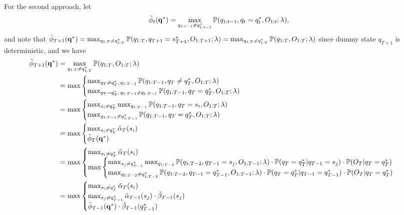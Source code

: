 For the second approach, let 
\begin{equation*}
\tilde{\phi}_t(\mathbf{q}^*) = \max_{q_{1:t-1} \ne q_{1:t-1}^*} \mathbb{P}(q_{1:t-1}, q_t = q_t^*, O_{1:t}; \lambda),
\end{equation*}
and note that 
$\tilde{\phi}_{T+1}(\mathbf{q}^*) = \max_{q_{1:T} \ne q_{1:T}^*} \mathbb{P}(q_{1:T}, q_{T+1} = s_{T+1}^*, O_{1:T+1}; \lambda) = \max_{q_{1:T} \ne q_{1:T}^*} \mathbb{P}(q_{1:T}, O_{1:T}; \lambda)$
since dummy state $q_{T+1}$ is deterministic, and we have 
\begin{align*}
\tilde{\phi}_{T+1}(\mathbf{q}^*) 
&= \max_{q_{1:T} \ne q_{1:T}^*} \mathbb{P}(q_{1:T}, O_{1:T}; \lambda) \\
&= \max \begin{cases}
          \max_{q_T \ne q_T^*, \, q_{1:T-1}} \mathbb{P}(q_{1:T-1}, q_T \ne q_T^*, O_{1:T}; \lambda) \\
          \max_{q_T = q_T^*, \, q_{1:T-1} \ne q_{1:T-1}} \mathbb{P}(q_{1:T-1}, q_T = q_T^*, O_{1:T}; \lambda)
        \end{cases} \\
&= \max \begin{cases}
          \max_{s_i \ne q_T^*} \max_{q_{1:T-1}} \mathbb{P}(q_{1:T-1}, q_T = s_i, O_{1:T}; \lambda) \\
          \max_{q_{1:T-1} \ne q_{1:T-1}^*} \mathbb{P}(q_{1:T-1}, q_T = q_T^*, O_{1:T}; \lambda)
        \end{cases} \\
&= \max \begin{cases}
          \max_{s_i \ne q_T^*} \tilde{\alpha}_T(s_i) \\
          \tilde{\phi}_T(\mathbf{q}^*)
        \end{cases} \\
&= \max \begin{cases}
          \max_{s_i \ne q_T^*} \tilde{\alpha}_T(s_i) \\
          \max \begin{cases}
                 \max_{s_j \ne q_{T-1}^*} \max_{q_{1:T-2}} \mathbb{P}(q_{1:T-2}, q_{T-1} = s_j, O_{1:T-1}; \lambda) \cdot \mathbb{P}(q_T = q_T^* |q_{T-1} = s_j) \cdot \mathbb{P}(O_T |q_T = q_T^*) \\
                 \max_{q_{1:T-2} \ne q_{1:T-2}^*} \mathbb{P}(q_{1:T-2}, q_{T-1} = q_{T-1}^*, O_{1:T-1}; \lambda) \cdot \mathbb{P}(q_T = q_T^* |q_{T-1} = q_{T-1}^*) \cdot \mathbb{P}(O_T |q_T = q_T^*)
               \end{cases}
        \end{cases} \\
&= \max \begin{cases}
          \max_{s_i \ne q_T^*} \tilde{\alpha}_T(s_i) \\
          \max_{s_j \ne q_{T-1}^*} \tilde{\alpha}_{T-1}(s_j) \cdot \tilde{\beta}_{T-1}(s_j) \\
          \tilde{\phi}_{T-1}(\mathbf{q}^*) \cdot \tilde{\beta}_{T-1}(q_{T-1}^*)
        \end{cases}
\end{align*}
